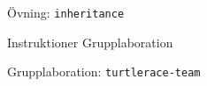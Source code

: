 

\ifkompendium\else




\begin{Slide}{Övning: \texttt{inheritance}}
\begin{itemize}\SlideFontTiny

\end{itemize}
\end{Slide}

\begin{Slide}{Instruktioner Grupplaboration}
\begin{itemize}\SlideFontSmall

\end{itemize}
\end{Slide}

\begin{Slide}{Grupplaboration: \texttt{turtlerace-team}}
\begin{itemize}

\end{itemize}
\end{Slide}



\fi

